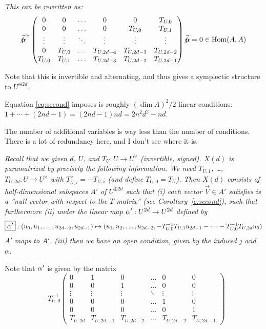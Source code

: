 { \label{c:second}
{\em This can be rewritten as:
  $$
 \vec{\mathord{j\mkern-7mu\alpha}}^\vee \begin{pmatrix} 0  &  0 & \hdots & 0  & 0 & T_{U,0} \\
    0 & 0 & \hdots & 0 & T_{U,0} & T_{U,1} \\
   \vdots  & \vdots  &  \ddots & \vdots  &  \vdots & \vdots \\
    0 & T_{U,0} & \hdots & T_{U,2d-4} & T_{U,2d-3} & T_{U,2d-2} \\
    T_{U,0} & T_{U,1}  & \hdots & T_{U,2d-3} & T_{U,2d-2} & T_{U,2d-1}
  \end{pmatrix}   \vec{\mathord{j\mkern-7mu\alpha}} =0 \in \operatorname{Hom}(A,A)
$$
}

Note that this  is invertible and alternating, and thus gives a symplectic structure to $U^{\oplus 2d}$.

Equation \eqref{eq:second} imposes is roughly $(\dim A)^2/2$ linear conditions:
$1+\cdots + (2nd-1) = (2nd-1)nd=2n^2d^2-nd$.

  
The number of additional variables is way less than the number of conditions.
There is a lot of redundancy here, and I don't see where it is.


  {\em Recall that we given $d$, $U$, and $T_U: U \rightarrow U^\vee$ (invertible, signed).
  $X(d)$ is paramatrized by precisely the following information.
 We need $T_{U,1}$, \dots, $T_{U,2d}: U \rightarrow U^\vee$ with $T_{U,i}^\vee = - T_{U,i}$ (and define $T_{U,0}=T_U$). Then $X(d)$ consists of half-dimensional subspaces $\boxed{A'}$ of $U^{\oplus 2d}$ such that (i) each vector $\vec{V} \in A'$ satisfies is a ''null vector with respect to the $T$-matrix'' 
 (see Corollary~\ref{c:second}), such that furthermore
(ii)  under the linear map $\alpha' : U^{2d} \rightarrow U^{2d}$ defined by  $$\boxed{\alpha'}: (u_0, u_1, \dots, u_{2d-2}, u_{2d-1}) \mapsto
 (u_1, u_2, \dots, u_{2d-2},
 -T^{-1}_{U,0} T_{U,1} u_{2d-1}  - \cdots  -T^{-1}_{U,0} T_{U,2d} u_0 )$$
 $A'$ maps to $A'$.  (iii) then we have an open condition, given by the induced $j$ and $\alpha$.
}

Note that $\alpha'$ is given by the matrix
$$ -T^{-1}_{U,0}
\begin{pmatrix}
  0 & 1  & 0 & \hdots &       0 &  0 \\
  0 & 0 &  1 & \hdots &       0 &  0 \\
\vdots & \vdots & \vdots & \ddots & \vdots & \vdots \\
  0 & 0 &  0 & \hdots &       1 &  0 \\
  0 & 0 &  0 & \hdots &       0 &  1 \\
 T_{U,2d} & T_{U,2d-1} & T_{U,2d-2} & \hdots & T_{U,2d-2} & T_{U,2d-1} 
  \end{pmatrix}
$$

}
